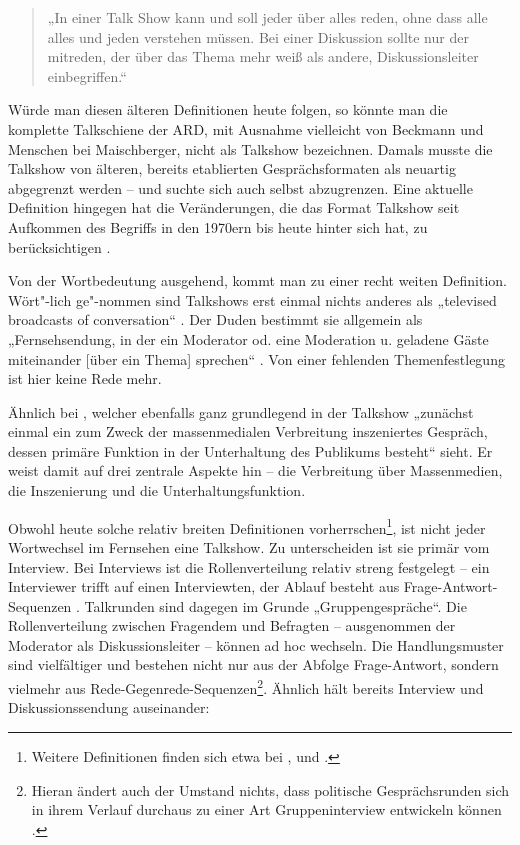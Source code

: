\begin{quote}
	„In einer Talk Show kann und soll jeder über alles reden, ohne dass alle alles und jeden verstehen müssen. Bei einer Diskussion sollte nur der mitreden, der über das Thema mehr weiß als andere, Diskussionsleiter einbegriffen.“
\end{quote}

Würde man diesen älteren Definitionen heute folgen, so könnte man die komplette Talkschiene der ARD, mit Ausnahme vielleicht von Beckmann und Menschen bei Maischberger, nicht als Talkshow bezeichnen. Damals musste die Talkshow von älteren, bereits etablierten Gesprächsformaten als neuartig abgegrenzt werden – und suchte sich auch selbst abzugrenzen. Eine aktuelle Definition hingegen hat die Veränderungen, die das Format Talkshow seit Aufkommen des Begriffs in den 1970ern bis heute hinter sich hat, zu berücksichtigen \parencites[101]{kalverkaemperKommentierteBibliographieZur1980}[13]{kellerGeschichteTalkshowDeutschland2009}.

Von der Wortbedeutung ausgehend, kommt man zu einer recht weiten Definition. Wört"-lich ge"-nommen sind Talkshows erst einmal nichts anderes als „televised broadcasts of conversation“ \parencite[329]{roseTalkShow1985}. Der Duden bestimmt sie allgemein als „Fernsehsendung, in der ein Moderator od. eine Moderation u. geladene Gäste miteinander [über ein Thema] sprechen“ \parencite[1047]{schochDudenDeutscheRechtschreibung2009}. Von einer fehlenden Themenfestlegung ist hier keine Rede mehr.

Ähnlich bei \textcite[134]{doernerPolitainmentPolitikMedialen2001}, welcher ebenfalls ganz grundlegend in der Talkshow „zunächst einmal ein zum Zweck der massenmedialen Verbreitung inszeniertes Gespräch, dessen primäre Funktion in der Unterhaltung des Publikums besteht“ sieht. Er weist damit auf drei zentrale Aspekte hin – die Verbreitung über Massenmedien, die Inszenierung und die Unterhaltungsfunktion.

Obwohl heute solche relativ breiten Definitionen vorherrschen\footnote{Weitere Definitionen finden sich etwa bei \textcite[10f.]{schichaTalkAufAllen2002}, \textcite[600f.]{eimerenTalkshowsFormateUnd1998} und \textcite[609]{kruegerThementrendsTalkshows90er1998}.}, ist nicht jeder Wortwechsel im Fernsehen eine Talkshow. Zu unterscheiden ist sie primär vom Interview. Bei Interviews ist die Rollenverteilung relativ streng festgelegt – ein Interviewer trifft auf einen Interviewten, der Ablauf besteht aus Frage-Antwort-Sequenzen \parencite[98f.]{heritageAnalyzingNewsInterviews1989}. Talkrunden sind dagegen im Grunde „Gruppengespräche“. Die Rollenverteilung zwischen Fragendem und Befragten – ausgenommen der Moderator als Diskussionsleiter – können ad hoc wechseln. Die Handlungsmuster sind vielfältiger und bestehen nicht nur aus der Abfolge Frage-Antwort, sondern vielmehr aus Rede-Gegenrede-Sequenzen\footnote{Hieran ändert auch der Umstand nichts, dass politische Gesprächsrunden sich in ihrem Verlauf durchaus zu einer Art Gruppeninterview entwickeln können \parencite[78ff.]{hollyPolitischeFernsehdiskussionenZur1986}.}. Ähnlich hält bereits \textcite[101]{mahloZurDiskussionUm1956} Interview und Diskussionssendung auseinander:

